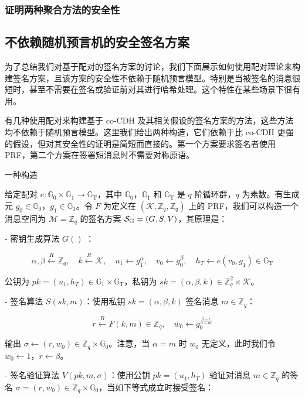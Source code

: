 \subsubsection{证明两种聚合方法的安全性}

\subsection{不依赖随机预言机的安全签名方案}\label{subsec:15-5-4}

为了总结我们对基于配对的签名方案的讨论，我们下面展示如何使用配对理论来构建签名方案，且该方案的安全性不依赖于随机预言模型。特别是当被签名的消息很短时，甚至不需要在签名或验证前对其进行哈希处理。这个特性在某些场景下很有用。

有几种使用配对来构建基于 co-CDH 及其相关假设的签名方案的方法，这些方法均不依赖于随机预言模型。这里我们给出两种构造，它们依赖于比 co-CDH 更强的假设，但对其安全性的证明是简短而直接的。第一个方案要求签名者使用 PRF，第二个方案在签署短消息时不需要对称原语。

一种构造

给定配对 $e: \mathbb{G}_0 \times\mathbb{G}_1\to\mathbb{G}_\mathrm{T}$，其中 $\mathbb{G}_0$，$\mathbb{G}_1$ 和 $\mathbb{G}_\mathrm{T}$ 是 $q$ 阶循环群，$q$ 为素数。有生成元 $g_0\in\mathbb{G}_0$，$g_1\in\mathbb{G}_1$。令 $F$ 为定义在 $(\mathcal{K},\mathbb{Z}_q,\mathbb{Z}_q)$ 上的 PRF，我们可以构造一个消息空间为 $\mathcal{M}=\mathbb{Z}_q$ 的签名方案 $\mathcal{S}_{\rm G}=(G,S,V)$，其原理是：

- 密钥生成算法 $G()$ ：
    
    \[
    \alpha,\beta\overset{R}\leftarrow\mathbb{Z}_q,
    \quad
    k\overset{R}\leftarrow\mathcal{K},
    \quad
    u_1\leftarrow g_1^\alpha,
    \quad
    v_0\leftarrow g_0^\beta,
    \quad
    h_T\leftarrow e(v_0,g_1)\in\mathbb{G}_\mathrm{T}
    \]
    
    公钥为 $pk=(u_1,h_T)\in\mathbb{G}_1\times\mathbb{G}_\mathrm{T}$，私钥为 $sk=(\alpha,\beta,k)\in\mathbb{Z}_q^2\times\mathcal{K}$。
    
- 签名算法 $S(sk,m)$：使用私钥 $sk=(\alpha,\beta,k)$ 签名消息 $m\in\mathbb{Z}_q$：
    
    \[
    r\overset{R}\leftarrow F(k,m)\in\mathbb{Z}_q,
    \quad
    w_0\leftarrow g_0^{\frac{\beta-r}{\alpha-m}}
    \]
    
    输出 $\sigma \leftarrow (r,w_0)\in\mathbb{Z}_q\times\mathbb{G}_0$。注意，当 $\alpha=m$ 时 $w_0$ 无定义，此时我们令 $w_0\leftarrow 1$，$r\leftarrow \beta$。
    
- 签名验证算法 $V(pk,m,\sigma)$：使用公钥 $pk=(u_1,h_T)$ 验证对消息 $m\in\mathbb{Z}_q$ 的签名 $\sigma=(r,w_0)\in\mathbb{Z}_q\times\mathbb{G}_0$，当如下等式成立时接受签名：

